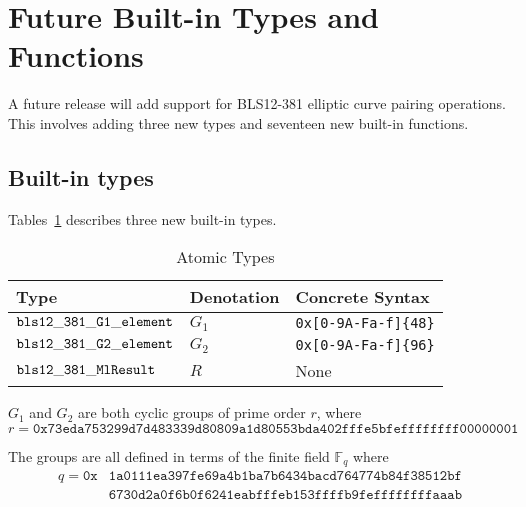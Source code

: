 \renewcommand{\note}[1]{
  \bigskip
  \refstepcounter{notenumberC}
  \noindent\textbf{Note \thenotenumberC. #1}
}

\newpage

\section{Future Built-in Types and Functions}
\label{appendix:default-builtins-future}
A future release will add support for BLS12-381 elliptic curve pairing
operations.  This involves adding three new types and seventeen new built-in
functions.

\subsection{Built-in types}
\label{sec:future-built-in-types}
Tables~\ref{table:future-built-in-types} describes three new built-in
types.

\newcommand{\MlResult}{R}
\newcommand{\Fq}{\mathbb{F}_q}
\newcommand{\Fqq}{\mathbb{F}_{q^2}}
\newcommand{\FF}{\mathbb{F}_{q^{12}}}

\begin{table}[H]
  \centering
    \begin{tabular}{|l|p{2cm}|l|}
        \hline
        Type & Denotation & Concrete Syntax\\
        \hline
        $\mathtt{bls12\_381\_G1\_element}$ &   $G_1$ & \texttt{0x[0-9A-Fa-f]\{48\}}\\
        $\mathtt{bls12\_381\_G2\_element}$ &   $G_2$ & \texttt{0x[0-9A-Fa-f]\{96\}}\\
        $\mathtt{bls12\_381\_MlResult}$    &   $\MlResult$  &  None\\
        \hline
    \end{tabular}
    \caption{Atomic Types}
    \label{table:future-built-in-types}
\end{table}


\noindent $G_1$ and  $G_2$ are both cyclic groups of prime order $r$, where 
$$
r = \mathtt{0x73eda753299d7d483339d80809a1d80553bda402fffe5bfeffffffff00000001}
$$


\noindent The groups are all defined in terms of the finite field $\Fq$ where
\begin{align*}
q = \mathtt{0x}&\mathtt{1a0111ea397fe69a4b1ba7b6434bacd764774b84f38512bf}\\
              &\mathtt{6730d2a0f6b0f6241eabfffeb153ffffb9feffffffffaaab}\\
\end{align*}

